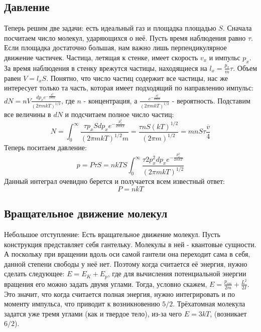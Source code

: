 \documentclass[a4paper, 12pt]{article}
\begin{document}
	\subsection{Давление}
	Теперь решим две задачи: есть идеальный газ и площадка площадью $S$. Сначала посчитаем число молекул, ударяющихся о неё. Пусть время наблюдения равно $\tau$. Если площадка достаточно большая, нам важно лишь перпендикулярное движение частичек. Частица, летящая к стенке, имеет скорость $v_{x}$ и импульс $p_{x}$. За время наблюдения в стенку врежутся частицы, находящиеся на $l_{x} = \frac{p_{x}}{m} \tau$. Объем равен $V=l_{x} S$. Понятно, что число частиц содержит все частицы, нас же интересует только та часть, которая имеет подходящий по направлению импульс: $dN   = nV \frac{ dp_{x} e^{-\frac{p_{x}^2}{2mkT}}}{(2 \pi mkT)^{1/2}}$, где $n$ - концентрация, а $\frac{e^{-\frac{p_{x}^2}{2mkT}}}{(2 \pi mkT)^{1/2}}$ - вероятность.
	Подставим все величины в $dN$ и подсчитаем полное число частиц:
	\begin{equation*}
		N  = \int_0^{\infty}   \frac{ \tau p_{x} S dp_{x} e^{-\frac{p_{x}^2}{2mkT}}}{(2 \pi mkT)^{1/2} m } = \frac{\tau n S (kT)^{1/2}}{(2 \pi m )^{1/2}} = m n S \tau \frac{\overline{v}}{4}
	\end{equation*}
	Теперь поситаем давление:
	\begin{equation*}
		p = P \tau S  = nkTS \int_{0}^{\infty}  \frac{ \tau 2 p_{x}^{2} dp_{x} e^{-\frac{p_{x}^2}{2mkT}}}{(2 \pi mkT)^{1/2} }
	\end{equation*}
	Данный интеграл очевидно берется и получается всем известный ответ:
	\begin{equation*}
		P = nkT
	\end{equation*}
	\subsection{Вращательное движение молекул}
	Небольшое отступление: Есть вращательное движение молекул. Пусть конструкция представляет себя гантельку. Молекулы в ней - квантовые сущности. А поскольку при вращении вдоль оси самой гантели она переходит сама в себя, данной степени свободы у неё нет. Поэтому когда считается её энергия, нужно сделать следующее: $E = E_{K} + E_{p}$, где для вычисления потенциальной энергии вращения его можно задать двумя углами. Тогда, условно скажем, $E = \frac{p_{cm}}{2m} + \frac{L^2}{2I}$.  Это значит, что когда считается полная энергия, нужно интегрировать и по моменту импульса, что приводит к возникновению $5/2$. Трёхатомная молекула задатся уже тремя углами (как и твердое тело), из-за чего $E = 3kT$, (возникает $6/2$).
\end{document}
